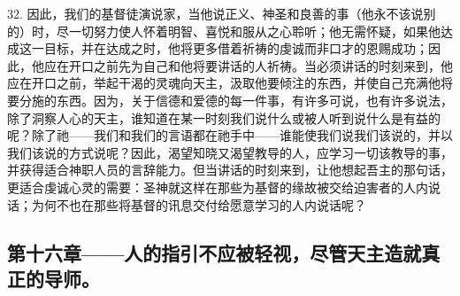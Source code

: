 32. 因此，我们的基督徒演说家，当他说正义、神圣和良善的事（他永不该说别的）时，尽一切努力使人怀着明智、喜悦和服从之心聆听；他无需怀疑，如果他达成这一目标，并在达成之时，他将更多借着祈祷的虔诚而非口才的恩赐成功；因此，他应在开口之前先为自己和他将要讲话的人祈祷。当必须讲话的时刻来到，他应在开口之前，举起干渴的灵魂向天主，汲取他要倾注的东西，并使自己充满他将要分施的东西。因为，关于信德和爱德的每一件事，有许多可说，也有许多说法，除了洞察人心的天主，谁知道在某一时刻我们说什么或被人听到说什么是有益的呢？除了祂——我们和我们的言语都在祂手中——谁能使我们说我们该说的，并以我们该说的方式说呢？因此，渴望知晓又渴望教导的人，应学习一切该教导的事，并获得适合神职人员的言辞能力。但当讲话的时刻来到，让他想起吾主的那句话，更适合虔诚心灵的需要：圣神就这样在那些为基督的缘故被交给迫害者的人内说话；为何不也在那些将基督的讯息交付给愿意学习的人内说话呢？\par


\subsection{第十六章——人的指引不应被轻视，尽管天主造就真正的导师。}

